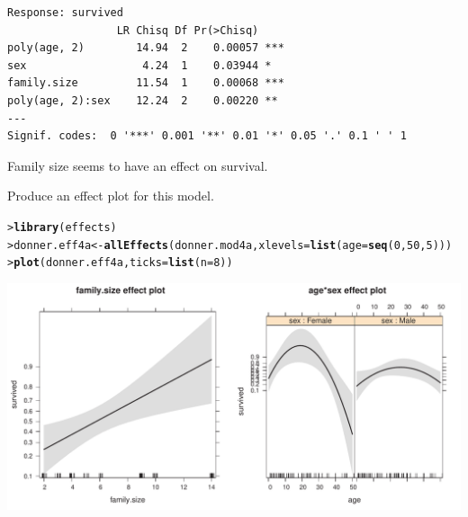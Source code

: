 \documentclass[10pt]{report}\usepackage[]{graphicx}\usepackage[]{color}
\makeatletter
\newcommand{\hlnum}[1]{\textcolor[rgb]{0.686,0.059,0.569}{#1}}%
\newcommand{\hlstd}[1]{\textcolor[rgb]{0.345,0.345,0.345}{#1}}%
\newcommand{\hlkwb}[1]{\textcolor[rgb]{0.69,0.353,0.396}{#1}}%
\newcommand{\hlkwc}[1]{\textcolor[rgb]{0.333,0.667,0.333}{#1}}%
\newcommand{\hlkwd}[1]{\textcolor[rgb]{0.737,0.353,0.396}{\textbf{#1}}}%
\newenvironment{kframe}{%
 \def\at@end@of@kframe{}%
 \ifinner\ifhmode%
  \def\at@end@of@kframe{\end{minipage}}%
  \begin{minipage}{\columnwidth}%
 \fi\fi%
 \def\FrameCommand##1{\hskip\@totalleftmargin \hskip-\fboxsep
 \colorbox{shadecolor}{##1}\hskip-\fboxsep
     \hskip-\linewidth \hskip-\@totalleftmargin \hskip\columnwidth}%
 \MakeFramed {\advance\hsize-\width
   \@totalleftmargin\z@ \linewidth\hsize
   \@setminipage}}%
 {\par\unskip\endMakeFramed%
 \at@end@of@kframe}
\newenvironment{knitrout}{}{} %
\renewenvironment{knitrout}{\small\renewcommand{\baselinestretch}{.85}}{} %
\makeatother
\begin{document}
\begin{Exercises}
\begin{enumerate*}
\begin{ans}
\begin{knitrout}
\begin{kframe}
\begin{verbatim}
Response: survived
                 LR Chisq Df Pr(>Chisq)    
poly(age, 2)        14.94  2    0.00057 ***
sex                  4.24  1    0.03944 *  
family.size         11.54  1    0.00068 ***
poly(age, 2):sex    12.24  2    0.00220 ** 
---
Signif. codes:  0 '***' 0.001 '**' 0.01 '*' 0.05 '.' 0.1 ' ' 1
\end{verbatim}
\end{kframe}
\end{knitrout}
    Family size seems to have an effect on survival.
    \end{ans}
    
    \item Produce an effect plot for this model.
    \begin{ans}
\begin{knitrout}\footnotesize
{}\color{fgcolor}\begin{kframe}
\begin{alltt}
\hlstd{> }\hlkwd{library}\hlstd{(effects)}
\hlstd{> }\hlstd{donner.eff4a} \hlkwb{<-} \hlkwd{allEffects}\hlstd{(donner.mod4a,} \hlkwc{xlevels}\hlstd{=}\hlkwd{list}\hlstd{(}\hlkwc{age}\hlstd{=}\hlkwd{seq}\hlstd{(}\hlnum{0}\hlstd{,}\hlnum{50}\hlstd{,}\hlnum{5}\hlstd{)))}
\hlstd{> }\hlkwd{plot}\hlstd{(donner.eff4a,} \hlkwc{ticks}\hlstd{=}\hlkwd{list}\hlstd{(}\hlkwc{n}\hlstd{=}\hlnum{8}\hlstd{))}
\end{alltt}
\end{kframe}

\centerline{\includegraphics[width=.75\textwidth]{soln/fig/ex7_2b-1} }



\end{knitrout}
    \end{ans}
    

\end{enumerate*}
\end{Exercises}
\end{document}
